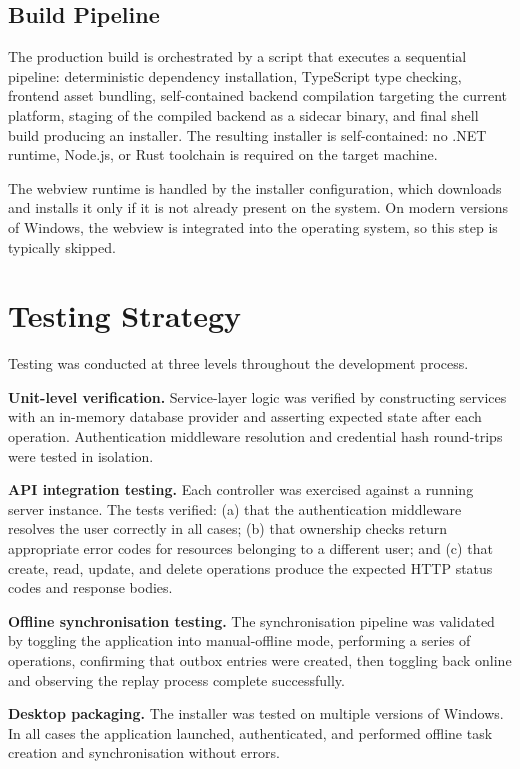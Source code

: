 \subsection{Build Pipeline}

The production build is orchestrated by a script that executes a sequential
pipeline: deterministic dependency installation, TypeScript type checking,
frontend asset bundling, self-contained backend compilation targeting the
current platform, staging of the compiled backend as a sidecar binary, and
final shell build producing an installer. The resulting installer is
self-contained: no .NET runtime, Node.js, or Rust toolchain is required on
the target machine.

The webview runtime is handled by the installer configuration, which downloads
and installs it only if it is not already present on the system. On modern
versions of Windows, the webview is integrated into the operating system, so
this step is typically skipped.

\section{Testing Strategy}\label{sec:meth_testing}

Testing was conducted at three levels throughout the development process.

\textbf{Unit-level verification.}
Service-layer logic was verified by constructing services with an in-memory
database provider and asserting expected state after each operation.
Authentication middleware resolution and credential hash round-trips were tested
in isolation.

\textbf{API integration testing.}
Each controller was exercised against a running server instance. The tests
verified: (a) that the authentication middleware resolves the user correctly
in all cases; (b) that ownership checks return appropriate error codes for
resources belonging to a different user; and (c) that create, read, update, and
delete operations produce the expected HTTP status codes and response bodies.

\textbf{Offline synchronisation testing.}
The synchronisation pipeline was validated by toggling the application into
manual-offline mode, performing a series of operations, confirming that outbox
entries were created, then toggling back online and observing the replay
process complete successfully.

\textbf{Desktop packaging.}
The installer was tested on multiple versions of Windows. In all cases the
application launched, authenticated, and performed offline task creation and
synchronisation without errors.
